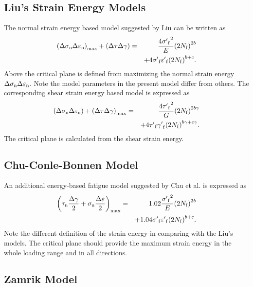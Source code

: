 \documentclass[preprint,5p,twocolumn,11pt,sort&compress]{elsarticle}
\begin{document}
\subsection{Liu's Strain Energy Models}
The normal strain energy based model suggested by Liu  \cite{Socie2000} can be written as
\begin{eqnarray*}
{\left( {\Delta {\sigma _{\rm n}}\Delta {\varepsilon _{\rm n}}} \right)_{\max }} + \left( {\Delta \tau \Delta \gamma } \right) &=& \frac{{4{{\sigma '}_{\rm f}}^2}}{E}{\left( {2{N_{\rm f}}} \right)^{2b}}
\\
& & + 4{{\sigma '}_{\rm f}}{{\varepsilon '}_{\rm f}}{\left( {2{N_{\rm f}}} \right)^{b + c}}.
\end{eqnarray*}
Above the critical plane is defined from maximizing the normal strain energy ${\Delta {\sigma _{\rm n}}\Delta {\varepsilon _{\rm n}}}$. Note the model parameters in the present model differ from others. The corresponding shear strain energy based model is expressed as
\begin{eqnarray*}
\left( {\Delta {\sigma _{\rm n}}\Delta {\varepsilon _{\rm n}}} \right) + {\left( {\Delta \tau \Delta \gamma } \right)_{\max }} &=& \frac{{4{{\tau '}_{\rm f}}^2}}{G}{\left( {2{N_{\rm f}}} \right)^{2b\gamma }}
\\
&& + 4{{\tau '}_{\rm f}}{{\gamma '}_{\rm f}}{\left( {2{N_{\rm f}}} \right)^{b\gamma  + c\gamma }}.
\end{eqnarray*}
The critical plane is calculated from the shear strain energy.

\subsection{Chu-Conle-Bonnen Model}
An additional energy-based fatigue model suggested by Chu et al.  \cite{Socie2000} is expressed as
\begin{eqnarray*}
{\left( {{\tau _{\rm n}}\frac{{\Delta \gamma }}{2} + {\sigma _{\rm n }}\frac{{\Delta \varepsilon }}{2}} \right)_{\max }} &=& 1.02\frac{{{{\sigma '}_{\rm f}}^2}}{E}{\left( {2{N_{\rm f}}} \right)^{2b}} \\
&& + 1.04{{\sigma '}_{\rm f}}{{\varepsilon '}_{\rm f}}{\left( {2{N_{\rm f}}} \right)^{b + c}}.
\end{eqnarray*}
Note the different definition of the strain energy in comparing with the Liu's models. The critical plane should provide the maximum strain energy in the whole loading range and in all directions.
 
\subsection{Zamrik Model}
\end{document}
